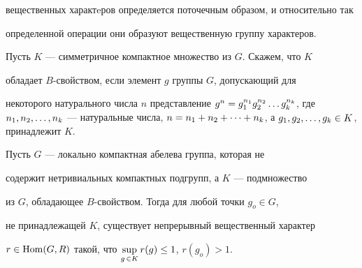 вещественных характeров определяется поточечным образом, и относительно так 


определенной операции они образуют вещественную группу характеров. 





\begin{defn}\label{op1}


Пусть $K$ --- симметричное компактное множество из $G$. Скажем, что $K$ 


обладает $B$-свойством, если элемент $g$ группы $G$, допускающий для 


некоторого натурального числа $n$ представление $g^n=g^{n_1}_1


g_2^{n_2}\ld g_k^{n_k}$, где $n_1,n_2,\ld,n_k$ --- натуральные числа, $n=n_1+


n_2+\ct+n_k$, а $g_1,g_2,\ld,g_k\in K$, принадлежит $K$.


\end{defn}





\begin{lemnonum}


Пусть $G$ --- локально компактная абелева группа, которая не 


содержит нетривиальных компактных подгрупп, а $K$ --- подмножество


из $G$, обладающее $B$-свойством. Тогда для любой точки $g_o\in G$,


не принадлежащей $K$, существует непрерывный вещественный характер


$r\in\operatorname{Hom}(G,R)$ такой, что $\sup\limits_{g\,\in K}r(g)\le1$, $r(g_o)>1$.


\end{lemnonum}





